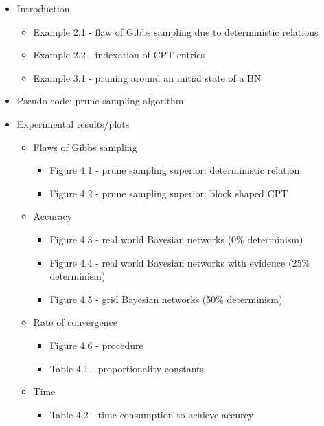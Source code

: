 \documentclass[a4paper, twoside, 11pt]{report}
\theoremstyle{plain}
\theoremstyle{definition}
\theoremstyle{remark}
\begin{document}



\newcommand\indep{\protect\mathpalette{\protect\independenT}{\perp}}
\def\independenT#1#2{\mathrel{\rlap{$#1#2$}\mkern2mu{#1#2}}}


\begin{itemize}
\item Introduction
\begin{itemize}
\item Example 2.1 - flaw of Gibbs sampling due to deterministic relations
\item Example 2.2 - indexation of CPT entries
\item Example 3.1 - pruning around an initial state of a BN
\end{itemize}

\item Pseudo code: prune sampling algorithm

\item Experimental results/plots

\begin{itemize}

\item Flaws of Gibbs sampling

\begin{itemize}
\item Figure 4.1 - prune sampling superior: deterministic relation
\item Figure 4.2 - prune sampling superior: block shaped CPT
\end{itemize}

\item Accuracy
\begin{itemize}
\item Figure 4.3 - real world Bayesian networks (0\% determinism)
\item Figure 4.4 - real world Bayesian networks with evidence (25\% determinism)
\item Figure 4.5 - grid Bayesian networks (50\% determinism)
\end{itemize}

\item Rate of convergence
\begin{itemize}
\item Figure 4.6 - procedure
\item Table 4.1 -  proportionality constants
\end{itemize}

\item Time
\begin{itemize}
\item Table 4.2 - time consumption to achieve accurcy
\end{itemize}


\end{itemize}
\end{itemize}
\end{document}
